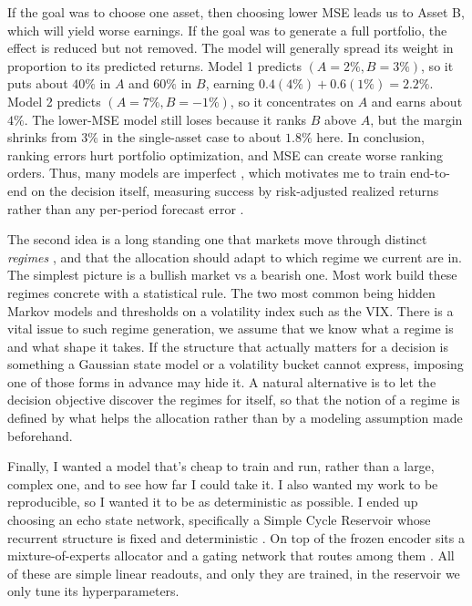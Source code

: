 If the goal was to choose one asset, then choosing lower MSE leads us to Asset B, which will yield worse earnings. If the goal was to generate a full portfolio, the effect is reduced but not removed. The model will generally spread its weight in proportion to its predicted returns. Model 1 predicts $(A=2\%, B=3\%)$, so it puts about $40\%$ in $A$ and $60\%$ in $B$, earning $0.4(4\%) + 0.6(1\%) = 2.2\%$. Model 2 predicts $(A=7\%, B=-1\%)$, so it concentrates on $A$ and earns about $4\%$. The lower-MSE model still loses because it ranks $B$ above $A$, but the margin shrinks from $3\%$ in the single-asset case to about $1.8\%$ here. In conclusion, ranking errors hurt portfolio optimization, and MSE can create worse ranking orders. Thus, many models are imperfect \cite{elmachtoub2022smart}, which motivates me to train end-to-end on the decision itself, measuring success by risk-adjusted realized returns rather than any per-period forecast error \cite{sharpe1994sharpe}.

The second idea is a long standing one that markets move through distinct \emph{regimes} \cite{hamilton1989new}, and that the allocation should adapt to which regime we current are in. The simplest picture is a bullish market vs a bearish one. Most work build these regimes concrete with a statistical rule. The two most common being hidden Markov models \cite{hamilton1989new} and thresholds on a volatility index such as the VIX. There is a vital issue to such regime generation, we assume that we know what a regime is and what shape it takes. If the structure that actually matters for a decision is something a Gaussian state model or a volatility bucket cannot express, imposing one of those forms in advance may hide it. A natural alternative is to let the decision objective discover the regimes for itself, so that the notion of a regime is defined by what helps the allocation rather than by a modeling assumption made beforehand.

Finally, I wanted a model that's cheap to train and run, rather than a large, complex one, and to see how far I could take it. I also wanted my work to be reproducible, so I wanted it to be as deterministic as possible. I ended up choosing an echo state network, specifically a Simple Cycle Reservoir whose recurrent structure is fixed and deterministic \cite{rodan2011simple}. On top of the frozen encoder sits a mixture-of-experts allocator and a gating network that routes among them \cite{jacobs1991adaptive}. All of these are simple linear readouts, and only they are trained, in the reservoir we only tune its hyperparameters. 



